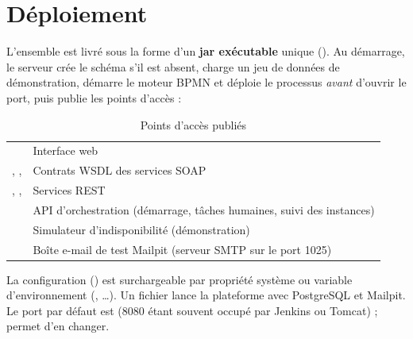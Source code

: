 \section{Déploiement}
L'ensemble est livré sous la forme d'un \textbf{jar exécutable} unique ().
Au démarrage, le serveur crée le schéma s'il est absent, charge un jeu de données de démonstration, démarre le moteur
BPMN et déploie le processus \emph{avant} d'ouvrir le port, puis publie les points d'accès :

\begin{table}[H]
\centering
\caption{Points d'accès publiés}
\begin{tabularx}{\textwidth}{@{}lY@{}}
\toprule
{} & Interface web \\
, ,  & Contrats WSDL des services SOAP \\
, ,  & Services REST \\
 & API d'orchestration (démarrage, tâches humaines, suivi des instances) \\
 & Simulateur d'indisponibilité (démonstration) \\
 & Boîte e-mail de test Mailpit (serveur SMTP sur le port 1025) \\
\bottomrule
\end{tabularx}
\end{table}

La configuration () est surchargeable par propriété système ou variable
d'environnement (, …). Un fichier  lance la plateforme avec
PostgreSQL et Mailpit. Le port par défaut est  (8080 étant souvent occupé par Jenkins ou Tomcat) ;  permet d'en changer.
